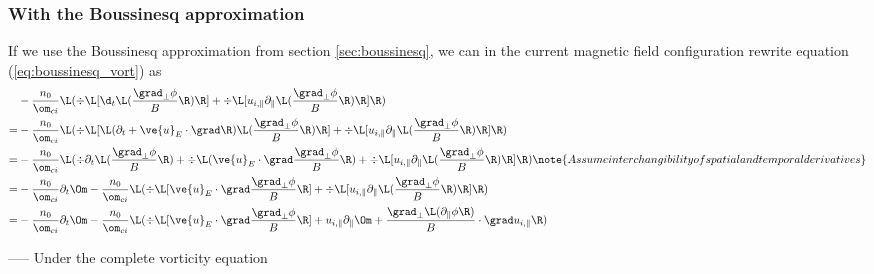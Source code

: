 \subsubsection{With the Boussinesq approximation}
If we use the Boussinesq approximation from section \ref{sec:boussinesq}, we
can in the current magnetic field configuration rewrite equation
(\ref{eq:boussinesq_vort}) as
%
\begin{align*}
    &- \frac{n_0}{\om_{ci}}
    \L( \div\L[ \d_t \L( \frac{\grad_\perp \phi}{B} \R) \R]
     + \div\L[ u_{i,\|}\partial_\| \L( \frac{\grad_\perp \phi}{B} \R) \R] \R)
     \\
     =&
     - \frac{n_0}{\om_{ci}}
     \L( \div\L[ \L(\partial_t
     + \ve{u}_E\cdot\grad\R) \L( \frac{\grad_\perp \phi}{B} \R) \R]
     + \div\L[ u_{i,\|}\partial_\| \L( \frac{\grad_\perp \phi}{B} \R) \R] \R)
     \\
     =&
     - \frac{n_0}{\om_{ci}}
     \L( \div \partial_t\L( \frac{\grad_\perp \phi}{B} \R)
     + \div \L(\ve{u}_E\cdot\grad \frac{\grad_\perp \phi}{B} \R)
     + \div\L[ u_{i,\|}\partial_\| \L( \frac{\grad_\perp \phi}{B} \R) \R] \R)
     \note{Assume interchangibility of spatial and temporal derivatives}
     \\
     =&
     - \frac{n_0}{\om_{ci}}\partial_t\Om
     - \frac{n_0}{\om_{ci}}
     \L(
     \div \L[\ve{u}_E\cdot\grad \frac{\grad_\perp \phi}{B} \R]
     + \div\L[ u_{i,\|}\partial_\| \L( \frac{\grad_\perp \phi}{B} \R) \R] \R)
     \\
     =&
     - \frac{n_0}{\om_{ci}}\partial_t\Om
     - \frac{n_0}{\om_{ci}}
     \L(
     \div \L[\ve{u}_E\cdot\grad \frac{\grad_\perp \phi}{B} \R]
     + u_{i,\|}\partial_\|\Om
     + \frac{\grad_\perp\L( \partial_\|\phi\R)}{B}\cdot\grad u_{i,\|}
     \R)
\end{align*}

-----
Under the complete vorticity equation



